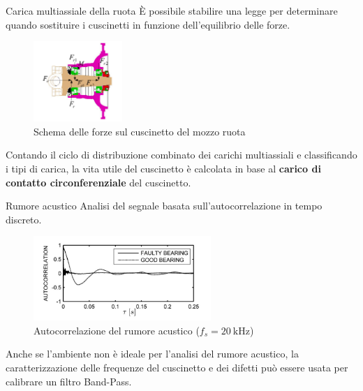 \documentclass{beamer}
\begin{document}
\begin{frame}{Carica multiassiale della ruota}
    \small
    È possibile stabilire una legge per determinare quando sostituire i cuscinetti in funzione dell'equilibrio delle forze\cite{zhao2021service}.

    \begin{figure}
        \centering
        \includegraphics[width=0.3\textwidth]{Figures/Force_Diagram.png}
        \caption{Schema delle forze sul cuscinetto del mozzo ruota}
        \label{fig:Forces_Bearing}
    \end{figure}

    Contando il ciclo di distribuzione combinato dei carichi multiassiali e classificando i tipi di carica, la vita utile del cuscinetto è calcolata in base al \textbf{carico di contatto circonferenziale} del cuscinetto.
\end{frame}

\begin{frame}{Rumore acustico}
    Analisi del segnale basata sull'autocorrelazione in tempo discreto.

    \begin{figure}
        \centering
        \includegraphics[width=0.6\textwidth]{Figures/Acoustic.png}
        \caption{Autocorrelazione del rumore acustico ($f_s = \SI{20}{\kilo \hertz}$)}
        \label{fig:acoustic}
    \end{figure}

    Anche se l'ambiente non è ideale per l'analisi del rumore acustico, la caratterizzazione delle frequenze del cuscinetto e dei difetti può essere usata per calibrare un filtro Band-Pass.

\end{frame}
\end{document}
